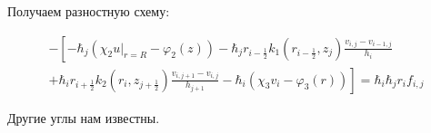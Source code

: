 Получаем разностную схему:

\begin{align*}
  - \left [ 
  -\hbar_j (\chi_2 \left . u \right \vert_{r=R} - \varphi_2(z) )
  - \hbar_j r_{i-\frac{1}{2}} k_1(r_{i-\frac{1}{2}}, z_j) \frac{v_{i, j} - v_{i - 1, j}}{h_{i}}
  \right . \\
  \left .
  + \hbar_i r_{i+\frac{1}{2}} k_2(r_i, z_{j+\frac{1}{2}}) \frac{v_{i, j + 1} - v_{i, j}}{h_{j + 1}}
  - \hbar_i(\chi_3 v_i - \varphi_3(r))
  \right ]  = \hbar_i \hbar_j r_i f_{i, j}
\end{align*}

Другие углы нам известны.

